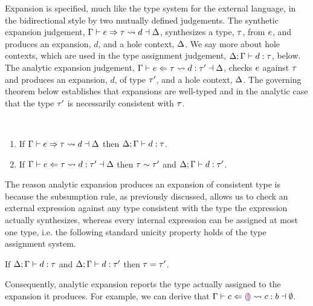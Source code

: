 Expansion is specified, much like the type system for the external language, in the bidirectional style by two mutually defined judgements. 
The synthetic expansion judgement, $\Gamma \vdash e \Rightarrow \tau \leadsto d \dashv \Delta$, synthesizes a type, $\tau$, from $e$, and produces an expansion, $d$, and a hole context, $\Delta$. 
We say more about hole contexts, which are used in the type assignment judgement, $\Delta; \Gamma \vdash d : \tau$, below. 
The analytic expansion judgement, $\Gamma \vdash e \Leftarrow \tau \leadsto d : \tau' \dashv \Delta$, checks $e$ against $\tau$ and produces an expansion, $d$, of type $\tau'$, and a hole context, $\Delta$. 
The governing theorem below establishes that expansions are well-typed and in the analytic case that the type $\tau'$ is necessarily consistent with $\tau$.
%
%
\begin{thm}\label{thm:typed-expansion} ~
  \begin{enumerate}[nolistsep]
    \item
      If $\Gamma \vdash e \Rightarrow \tau \leadsto d \dashv \Delta$
      then $\Delta; \Gamma \vdash d : \tau$.
    \item
      If $\Gamma \vdash e \Leftarrow \tau \leadsto d : \tau' \dashv \Delta$
      then $\tau \sim \tau'$ and $\Delta; \Gamma \vdash d : \tau'$.
  \end{enumerate}
\end{thm}
\noindent
The reason analytic expansion produces an expansion of consistent type is because the subsumption rule, as previously discussed, allows us to check an external expression against any type consistent with the type the expression actually synthesizes, whereas every internal expression can be assigned at most one type, i.e. the following standard unicity property holds of the type assignment system.
\begin{thm}
  If $\Delta; \Gamma \vdash d : \tau$
  and $\Delta; \Gamma \vdash d : \tau'$
  then $\tau=\tau'$.
\end{thm}
\noindent
Consequently, analytic expansion reports the type actually assigned to the expansion it produces. For example, we can derive that $\Gamma \vdash c \Leftarrow \textcolor{violet}{\llparenthesis}\textcolor{violet}{\rrparenthesis} \leadsto c : b \dashv \emptyset$.%

